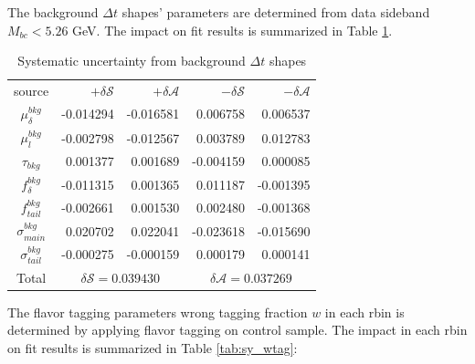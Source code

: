 The background $\Delta t$ shapes' parameters are determined from data sideband $M_{bc}<5.26$ GeV. The impact on fit results is summarized in Table \ref{tab:sy_bkgt}.
\begin{table}[htpb]
	\begin{minipage}[b]{1.0\linewidth}
		\centering
		\caption{Systematic uncertainty from background $\Delta t$ shapes}
		\label{tab:sy_bkgt}
		\begin{tabular}{c r r r r}
			\hline
			source & $+\delta \mathcal{S}$ & $+\delta \mathcal{A}$ & $-\delta \mathcal{S}$ &  $-\delta \mathcal{A}$\\
			$\mu^{bkg}_{\delta}$ & -0.014294
			& -0.016581
			& 0.006758
			& 0.006537
			\\
			$\mu^{bkg}_{l}$&  -0.002798
			& -0.012567
			& 0.003789
			& 0.012783
			\\
			$\tau_{bkg}$ & 0.001377
			& 0.001689
			& -0.004159
			& 0.000085\\
			$f_{\delta}^{bkg}$ &  -0.011315
			& 0.001365
			& 0.011187
			& -0.001395
			\\
			$f^{bkg}_{tail}$  &-0.002661
			& 0.001530
			& 0.002480
			& -0.001368
			\\
			$\sigma^{bkg}_{main}$ & 0.020702
			& 0.022041
			& -0.023618
			& -0.015690
			\\
			$\sigma^{bkg}_{tail}$ & -0.000275 & -0.000159
			& 0.000179
			& 0.000141
			\\
			\hline
			Total &
			\multicolumn{2}{c}{$\delta \mathcal{S}=0.039430$} &
			\multicolumn{2}{c}{$\delta \mathcal{A}=0.037269$}\\
			\hline
		\end{tabular}
	\end{minipage}
\end{table}
The flavor tagging parameters wrong tagging fraction $ w$ in each rbin is determined by applying flavor tagging on control sample. The impact in each rbin on fit results is summarized in Table \ref{tab:sy_wtag}: 
